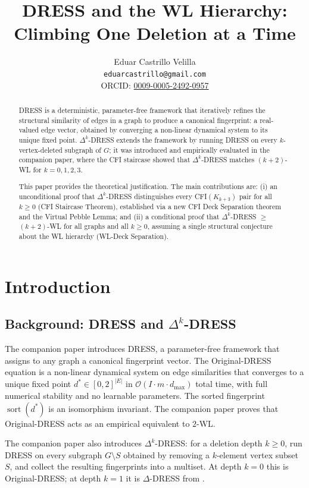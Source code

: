 \documentclass[11pt,a4paper]{article}
\title{DRESS and the WL Hierarchy: Climbing One Deletion at a Time}
\author{Eduar Castrillo Velilla \\ \texttt{eduarcastrillo@gmail.com} \\ ORCID: \href{https://orcid.org/0009-0005-2492-0957}{0009-0005-2492-0957}}
\date{}
\begin{document}
\maketitle

\begin{abstract}
DRESS is a deterministic, parameter-free framework that iteratively refines the structural similarity of edges in a graph to produce a canonical fingerprint: a real-valued edge vector, obtained by converging a non-linear dynamical system to its unique fixed point. $\Delta^k$-DRESS extends the framework by running DRESS on every $k$-vertex-deleted subgraph of $G$; it was introduced and empirically evaluated in the companion paper, where the CFI staircase showed that $\Delta^k$-DRESS matches $(k{+}2)$-WL for $k = 0, 1, 2, 3$.

This paper provides the theoretical justification. The main contributions are: (i) an unconditional proof that $\Delta^k$-DRESS distinguishes every CFI$(K_{k+3})$ pair for all $k \geq 0$ (CFI Staircase Theorem), established via a new CFI Deck Separation theorem and the Virtual Pebble Lemma; and (ii) a conditional proof that $\Delta^k$-DRESS $\geq$ $(k{+}2)$-WL for all graphs and all $k \geq 0$, assuming a single structural conjecture about the WL hierarchy (WL-Deck Separation).
\end{abstract}

\section{Introduction}

\subsection{Background: DRESS and \texorpdfstring{$\Delta^k$}{Delta-k}-DRESS}

The companion paper \cite{castrillo2026dress} introduces DRESS, a parameter-free framework that assigns to any graph a canonical fingerprint vector. The Original-DRESS equation is a non-linear dynamical system on edge similarities that converges to a unique fixed point $d^* \in [0,2]^{|E|}$ in $\mathcal{O}(I \cdot m \cdot d_{\max})$ total time, with full numerical stability and no learnable parameters. The sorted fingerprint $\operatorname{sort}(d^*)$ is an isomorphism invariant. The companion paper proves that Original-DRESS acts as an empirical equivalent to $2$-WL.

The companion paper also introduces $\Delta^k$-DRESS: for a deletion depth $k \geq 0$, run DRESS on every subgraph $G \setminus S$ obtained by removing a $k$-element vertex subset $S$, and collect the resulting fingerprints into a multiset. At depth $k=0$ this is Original-DRESS; at depth $k=1$ it is $\Delta$-DRESS from \cite{castrillo2026dress}.
\end{document}
